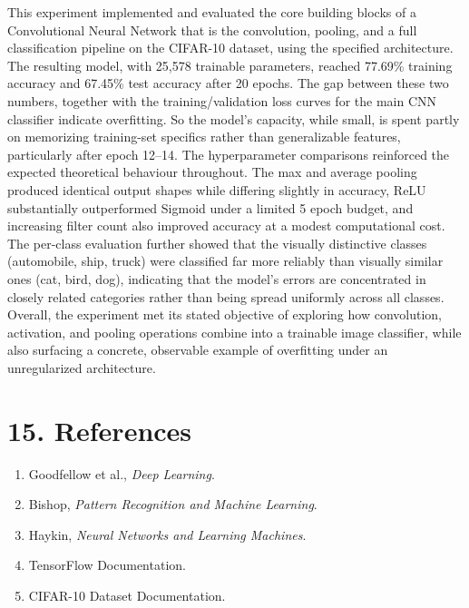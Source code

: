 \documentclass[11pt]{article}
\begin{document}
This experiment implemented and evaluated the core building blocks of a Convolutional Neural Network that is the convolution, pooling, and a full classification pipeline on the CIFAR-10 dataset, using the specified architecture. The resulting model, with 25,578 trainable parameters, reached 77.69\% training accuracy and 67.45\% test accuracy after 20 epochs. The gap between these two numbers, together with the training/validation loss curves for the main CNN classifier indicate overfitting. So the model's capacity, while small, is spent partly on memorizing training-set specifics rather than generalizable features, particularly after epoch 12--14. The hyperparameter comparisons reinforced the expected theoretical behaviour throughout. The max and average pooling produced identical output shapes while differing slightly in accuracy, ReLU substantially outperformed Sigmoid under a limited 5 epoch budget, and increasing filter count also improved accuracy at a modest computational cost. The per-class evaluation further showed that the visually distinctive classes (automobile, ship, truck) were classified far more reliably than visually similar ones (cat, bird, dog), indicating that the model's errors are concentrated in closely related categories rather than being spread uniformly across all classes. Overall, the experiment met its stated objective of exploring how convolution, activation, and pooling operations combine into a trainable image classifier, while also surfacing a concrete, observable example of overfitting under an unregularized architecture.

\section*{15. References}

\begin{enumerate}
\item Goodfellow et al., \emph{Deep Learning}.
\item Bishop, \emph{Pattern Recognition and Machine Learning}.
\item Haykin, \emph{Neural Networks and Learning Machines}.
\item TensorFlow Documentation.
\item CIFAR-10 Dataset Documentation.
\end{enumerate}
\end{document}
